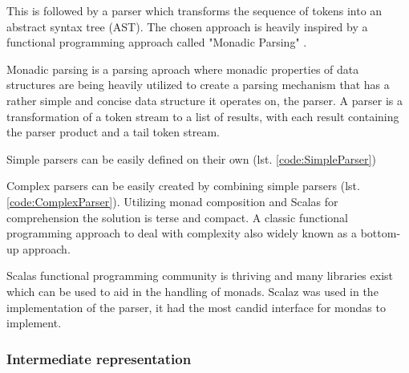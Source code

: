 \documentclass{VUMIFPSbakalaurinis}
\begin{document}
This is followed by a parser which transforms the sequence of tokens into an abstract syntax tree (AST).
The chosen approach is heavily inspired by a functional programming approach called "Monadic Parsing" \cite{MonadicParsing}.

Monadic parsing is a parsing aproach where monadic properties of data structures are being heavily utilized to create a parsing mechanism that has a rather simple and concise data structure it operates on, the parser.
A parser is a transformation of a token stream to a list of results, with each result containing the parser product and a tail token stream.

Simple parsers can be easily defined on their own (lst. \ref{code:SimpleParser})


\noindent
\begin{minipage}{.45\textwidth}
  
\end{minipage}\hfill
\begin{minipage}{.45\textwidth}
  
\end{minipage}

Complex parsers can be easily created by combining simple parsers (lst. \ref{code:ComplexParser}).
Utilizing monad composition and Scalas for comprehension the solution is terse and compact.
A classic functional programming approach to deal with complexity also widely known as a bottom-up approach.

Scalas functional programming community is thriving and many libraries exist which can be used to aid in the handling of monads.
Scalaz \cite{scalaz} was used in the implementation of the parser, it had the most candid interface for mondas to implement.


\subsubsection{Intermediate representation}
\end{document}

